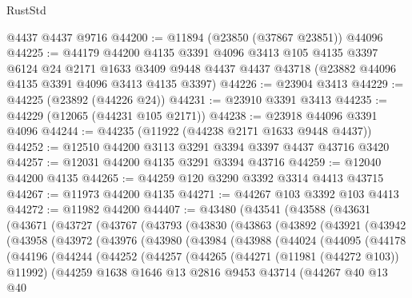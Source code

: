 \begin{lexlean}{RustStd}
\begin{coremodule}
    @4437
    @4437
    @9716
@44200 := @11894 (@23850 (@37867 @23851)) @44096
@44225 := @44179
    @44200
    @4135
    @3391
    @4096
    @3413
    @105
    @4135
    @3397
    @6124
    @24
    @2171
    @1633
    @3409
    @9448
    @4437
    @4437
    @43718
    (@23882 @44096 @4135 @3391 @4096 @3413 @4135 @3397)
@44226 := @23904 @3413
@44229 := @44225 (@23892 (@44226 @24))
@44231 := @23910 @3391 @3413
@44235 := @44229 (@12065 (@44231 @105 @2171))
@44238 := @23918 @44096 @3391 @4096
@44244 := @44235 (@11922 (@44238 @2171 @1633 @9448 @4437))
@44252 := @12510 @44200 @3113 @3291 @3394 @3397 @4437 @43716 @3420
@44257 := @12031 @44200 @4135 @3291 @3394 @43716
@44259 := @12040 @44200 @4135
@44265 := @44259 @120 @3290 @3392 @3314 @4413 @43715
@44267 := @11973 @44200 @4135
@44271 := @44267 @103 @3392 @103 @4413
@44272 := @11982 @44200
@44407 := @43480
    (@43541
      (@43588
        (@43631
          (@43671
            (@43727
              (@43767
                (@43793
                  (@43830
                    (@43863
                      (@43892
                        (@43921
                          (@43942
                            (@43958
                              (@43972
                                (@43976
                                  (@43980
                                    (@43984
                                      (@43988
                                        (@44024
                                          (@44095
                                            (@44178
                                              (@44196
                                                (@44244
                                                  (@44252
                                                    (@44257
                                                      (@44265
                                                        (@44271 (@11981 (@44272 @103)) @11992)
                                                        (@44259
                                                          @1638
                                                          @1646
                                                          @13
                                                          @2816
                                                          @9453
                                                          @43714
                                                          (@44267
                                                            @40
                                                            @13
                                                            @40

\end{coremodule}
\end{lexlean}
